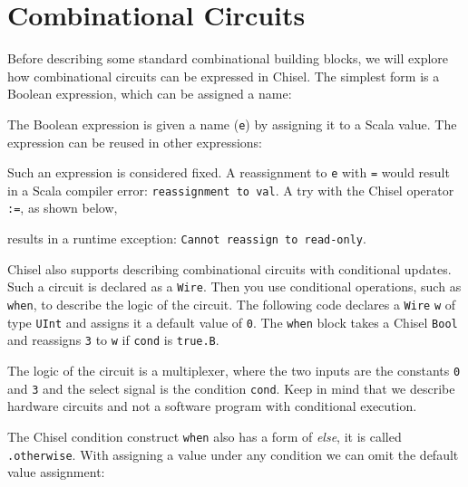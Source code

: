\documentclass[%
    10pt,
    headinclude, footexclude,
    openright, %
    notitlepage,
    cleardoubleempty,
    headsepline,
    pointlessnumbers,
    bibtotoc, idxtotoc,
    ]{scrbook}
\newcommand{\code}[1]{{\lstinline[basicstyle=\small\ttfamily]{#1}}}
\begin{document}
\section{Combinational Circuits}


Before describing some standard combinational building blocks, we will explore
how combinational circuits can be expressed in Chisel.
The simplest form is a Boolean expression, which can be assigned a name:


\noindent The Boolean expression is given a name (\code{e}) by assigning it
to a Scala value. The expression can be reused in other expressions:


Such an expression is considered fixed. A reassignment to \code{e}
with \code{=} would result in a Scala compiler error: \code{reassignment to val}.
A try with the Chisel operator \code{:=}, as shown below,


\noindent results in a runtime exception: \code{Cannot reassign to read-only}.

Chisel also supports describing combinational circuits with conditional updates.
Such a circuit is declared as a \code{Wire}. Then you use conditional operations,
such as \code{when}, to describe the logic of the circuit.
The following code declares a \code{Wire} \code{w} of type \code{UInt} and assigns it a default
value of \code{0}. The \code{when} block takes a Chisel \code{Bool} and reassigns
\code{3} to \code{w} if \code{cond} is \code{true.B}.


\noindent The logic of the circuit is a multiplexer, where the two inputs are the constants
\code{0} and \code{3} and the select signal is the condition \code{cond}.
Keep in mind that we describe hardware circuits and not a software program with conditional
execution.

The Chisel condition construct \code{when} also has a form of \emph{else}, it is called
\code{.otherwise}. With assigning a value under any condition we can omit the default
value assignment:


\end{document}
